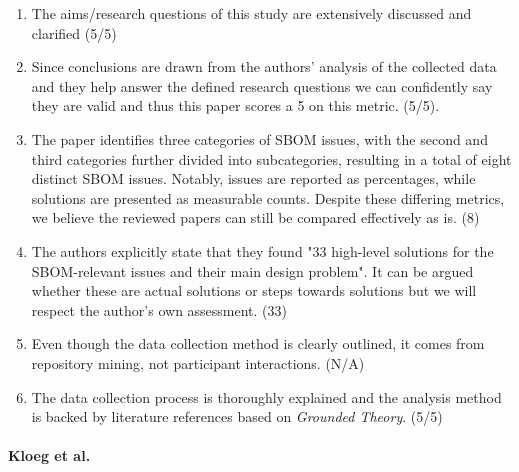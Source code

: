 \begin{enumerate}
    \item The aims/research questions of this study are extensively discussed and clarified (5/5)
    \item Since conclusions are drawn from the authors' analysis of the collected data and they help answer the defined research questions we can confidently say they are valid and thus this paper scores a 5 on this metric. (5/5).
    \item The paper identifies three categories of SBOM issues, with the second and third categories further divided into subcategories, resulting in a total of eight distinct SBOM issues. Notably, issues are reported as percentages, while solutions are presented as measurable counts. Despite these differing metrics, we believe the reviewed papers can still be compared effectively as is. (8)
    \item The authors explicitly state that they found "33 high-level solutions for the SBOM-relevant issues and their main design problem". It can be argued whether these are actual solutions or steps towards solutions but we will respect the author's own assessment. (33)
    \item Even though the data collection method is clearly outlined, it comes from repository mining, not participant interactions. (N/A)
    \item The data collection process is thoroughly explained and the analysis method is backed by literature references based on \emph{Grounded Theory}. (5/5)
\end{enumerate}

\paragraph{Kloeg et al. \cite{article:business-sbom}}

